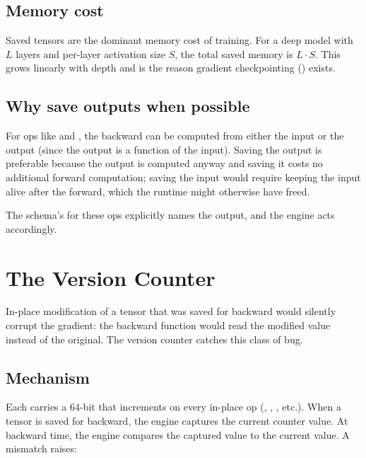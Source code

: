\subsection{Memory cost}
\label{ssec:autograd_engine:saved_memory}

Saved tensors are the dominant memory cost of training. For a
deep model with $L$ layers and per-layer activation size $S$, the
total saved memory is $L \cdot S$. This grows linearly with depth
and is the reason gradient checkpointing
() exists.

\subsection{Why save outputs when possible}
\label{ssec:autograd_engine:save_outputs}

For ops like  and , the backward can be
computed from either the input or the output (since the output is
a function of the input). Saving the output is preferable because
the output is computed anyway and saving it costs no additional
forward computation; saving the input would require keeping the
input alive after the forward, which the runtime might otherwise
have freed.

The schema's  for these ops explicitly
names the output, and the engine acts accordingly.

\section{The Version Counter}
\label{sec:autograd_engine:version}

In-place modification of a tensor that was saved for backward
would silently corrupt the gradient: the backward function would
read the modified value instead of the original. The version
counter catches this class of bug.

\subsection{Mechanism}
\label{ssec:autograd_engine:version_mech}

Each  carries a 64-bit 
that increments on every in-place op (, ,
, etc.). When a tensor is saved for backward, the
engine captures the current counter value. At backward time, the
engine compares the captured value to the current value. A
mismatch raises:

